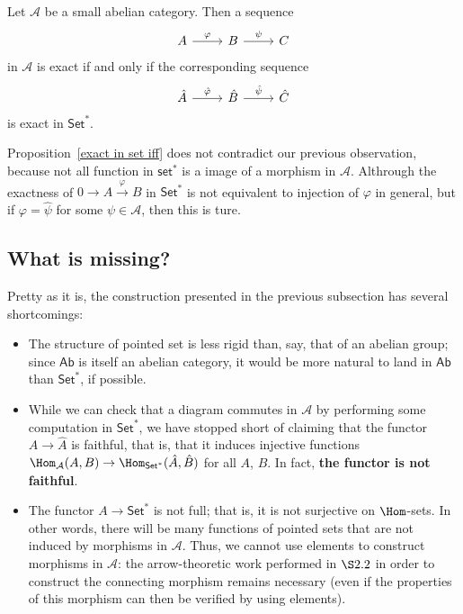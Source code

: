 \begin{proposition}\label{exact in set iff}
Let $\mathcal{A}$ be a small abelian category. Then a sequence
\[\begin{tikzcd}
A\ar[r,"\varphi"]&B\ar[r,"\psi"]&C
\end{tikzcd}\]
in $\mathcal{A}$ is exact if and only if the corresponding sequence
\[\begin{tikzcd}
\hat{A}\ar[r,"\hat{\varphi}"]&\hat{B}\ar[r,"\hat{\psi}"]&\hat{C}
\end{tikzcd}\]
is exact in $\mathsf{Set}^*$.
\end{proposition}
\begin{remark}
Proposition~\ref{exact in set iff} does not contradict our previous observation, because not all function in $\mathsf{set}^*$ is a image of a morphism in $\mathcal{A}$. Althrough the exactness of $0\to A\stackrel{\varphi}{\to}B$ in $\mathsf{Set}^*$ is not equivalent to injection of $\varphi$ in general, but if $\varphi=\hat{\psi}$ for some $\psi\in\mathcal{A}$, then this is ture.
\subsection{What is missing?}
Pretty as it is, the construction presented in the previous subsection has several shortcomings:
\begin{itemize}
\item The structure of pointed set is less rigid than, say, that of an abelian group; since $\mathsf{Ab}$ is itself an abelian category, it would be more natural to land in $\mathsf{Ab}$ than $\mathsf{Set}^*$, if possible.
\item While we can check that a diagram commutes in $\mathcal{A}$ by performing some computation in $\mathsf{Set}^*$, we have stopped short of claiming that the functor $A\to\hat{A}$ is faithful, that is, that it induces injective functions $\Hom_{\mathcal{A}}(A,B)\to\Hom_{\mathsf{Set}^*}(\hat{A},\hat{B})$ for all $A$, $B$. In fact, \textbf{the functor is not faithful}.
\item The functor $A\to\mathsf{Set}^*$ is not full; that is, it is not surjective on $\Hom$-sets. In other words, there will be many functions of pointed sets that are not induced by morphisms in $\mathcal{A}$. Thus, we cannot use elements to construct morphisms in $\mathcal{A}$: the arrow-theoretic work performed in $\S 2.2$ in order to construct the connecting morphism remains necessary (even if the properties of this morphism can then be verified by using elements).
\end{itemize}
\end{remark}
